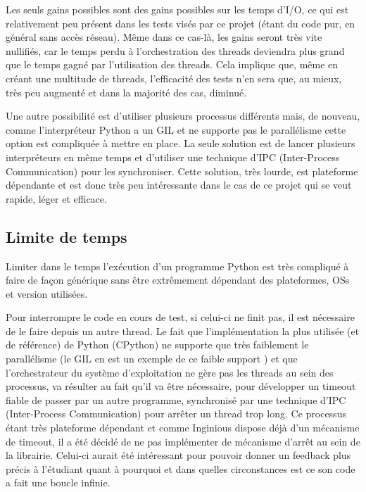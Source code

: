 \documentclass[a4paper]{report}
\begin{document}
Les seuls gains possibles sont des gains possibles sur les temps d'I/O, ce qui est relativement peu présent dans les tests visés par ce projet (étant du code pur, en général sans accès réseau).
Même dans ce cas-là, les gains seront très vite nullifiés, car le temps perdu à l'orchestration des threads deviendra plus grand que le temps gagné par l'utilisation des threads.
Cela implique que, même en créant une multitude de threads, l'efficacité des tests n'en sera que, au mieux, très peu augmenté et dans la majorité des cas, diminué.

Une autre possibilité est d'utiliser plusieurs processus différents mais, de nouveau, comme l'interpréteur Python a un GIL\cite{pythonGlobalInterpreterLockPython} et ne supporte pas le parallélisme cette option est compliquée à mettre en place.
La seule solution est de lancer plusieurs interpréteurs en même temps et d'utiliser une technique d'IPC (Inter-Process Communication) pour les synchroniser.
Cette solution, très lourde, est plateforme dépendante et est donc très peu intéressante dans le cas de ce projet qui se veut rapide, léger et efficace.


\subsection{Limite de temps}
Limiter dans le temps l'exécution d'un programme Python est très compliqué à faire de façon générique sans être extrêmement dépendant des plateformes, OSs et version utilisées.

Pour interrompre le code en cours de test, si celui-ci ne finit pas, il est nécessaire de le faire depuis un autre thread.
Le fait que l'implémentation la plus utilisée (et de référence) de Python (CPython) ne supporte que très faiblement le parallélisme (le GIL en est un exemple de ce faible support \cite{archiveThreadStateGIDPython}\cite{pythonGlobalInterpreterLockPython}) et que l'orchestrateur du système d'exploitation ne gère pas les threads au sein des processus, va résulter au fait qu'il va être nécessaire, pour développer un timeout fiable de passer par un autre programme, synchronisé par une technique d'IPC (Inter-Process Communication) pour arrêter un thread trop long.
Ce processus étant très plateforme dépendant et comme Inginious dispose déjà d'un mécanisme de timeout, il a été décidé de ne pas implémenter de mécanisme d'arrêt au sein de la librairie.
Celui-ci aurait été intéressant pour pouvoir donner un feedback plus précis à l'étudiant quant à pourquoi et dans quelles circonstances est ce son code a fait une boucle infinie.
\end{document}
